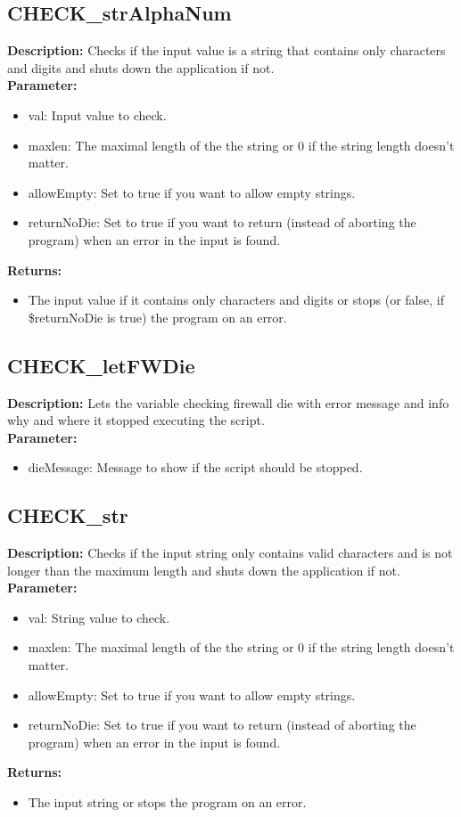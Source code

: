 \subsection{CHECK\_strAlphaNum}
\textbf{Description:} Checks if the input value is a string that contains only characters and digits and shuts down the application if not.\\
\textbf{Parameter:}
\begin{itemize}
\item val: Input value to check.
\item maxlen: The maximal length of the the string or 0 if the string length doesn't matter.
\item allowEmpty: Set to true if you want to allow empty strings.
\item returnNoDie: Set to true if you want to return (instead of aborting the program) when an error in the input is found.
\end{itemize}
\textbf{Returns:}
\begin{itemize}
\item The input value if it contains only characters and digits or stops (or false, if \$returnNoDie is true) the program on an error.
\end{itemize}

\subsection{CHECK\_letFWDie}
\textbf{Description:} Lets the variable checking firewall die with error message and info why and where it stopped executing the script.\\
\textbf{Parameter:}
\begin{itemize}
\item dieMessage: Message to show if the script should be stopped.
\end{itemize}

\subsection{CHECK\_str}
\textbf{Description:} Checks if the input string only contains valid characters and is not longer than the maximum length and shuts down the application if not.\\
\textbf{Parameter:}
\begin{itemize}
\item val: String value to check.
\item maxlen: The maximal length of the the string or 0 if the string length doesn't matter.
\item allowEmpty: Set to true if you want to allow empty strings.
\item returnNoDie: Set to true if you want to return (instead of aborting the program) when an error in the input is found.
\end{itemize}
\textbf{Returns:}
\begin{itemize}
\item The input string or stops the program on an error.
\end{itemize}

